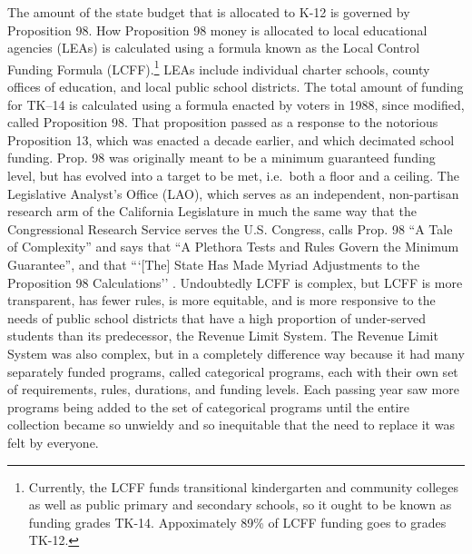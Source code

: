 The amount of the state budget that is allocated to K-12 is governed by Proposition 98. How Proposition 98 money is allocated to local educational agencies (LEAs) is calculated using a formula known as the Local Control Funding Formula (LCFF).\footnote{Currently, the LCFF funds transitional kindergarten and community colleges as well as public primary and secondary schools, so it ought to be known as funding grades TK-14. Appoximately 89\% of LCFF funding goes to grades TK-12.} LEAs include individual charter schools, county offices of education, and local public school districts. The total amount of funding for TK–14 is calculated using a formula enacted by voters in 1988, since modified, called Proposition 98. That proposition passed as a response to the notorious Proposition 13, which was enacted a decade earlier, and which decimated school funding. Prop. 98 was originally meant to be a minimum guaranteed funding level, but has evolved into a target to be met, i.e.~both a floor and a ceiling. The Legislative Analyst's Office (LAO), which serves as an independent, non-partisan research arm of the California Legislature in much the same way that the Congressional Research Service serves the U.S. Congress, calls Prop. 98 ``A Tale of Complexity''  and says that ``A Plethora Tests and Rules Govern the Minimum Guarantee'', and that ```[The] State Has Made Myriad Adjustments to the Proposition 98 Calculations'' \parencite[5]{LAO2017}.
Undoubtedly LCFF is complex, but LCFF is more transparent, has fewer rules, is more equitable, and is more responsive to the needs of public school districts that have a high proportion of under-served students than its predecessor, the Revenue Limit System. The Revenue Limit System was also complex, but in a completely difference way because it had many separately funded programs, called categorical programs, each with their own set of requirements, rules, durations, and funding levels. Each passing year saw more programs being added to the set of categorical programs until the entire collection became so unwieldy and so inequitable that the need to replace it was felt by everyone.

